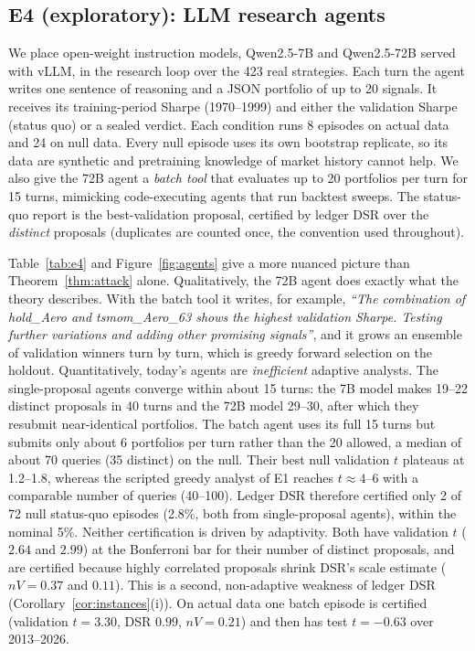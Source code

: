 \subsection{E4 (exploratory): LLM research agents}
We place open-weight instruction models, Qwen2.5-7B and Qwen2.5-72B \citep{qwen2024qwen25} served with vLLM, in the research loop over the 423 real strategies. Each turn the agent writes one sentence of reasoning and a JSON portfolio of up to 20 signals. It receives its training-period Sharpe (1970--1999) and either the validation Sharpe (status quo) or a sealed verdict. Each condition runs 8 episodes on actual data and 24 on null data. Every null episode uses its own bootstrap replicate, so its data are synthetic and pretraining knowledge of market history cannot help. We also give the 72B agent a \emph{batch tool} that evaluates up to 20 portfolios per turn for 15 turns, mimicking code-executing agents that run backtest sweeps. The status-quo report is the best-validation proposal, certified by ledger DSR over the \emph{distinct} proposals (duplicates are counted once, the convention used throughout).



Table~\ref{tab:e4} and Figure~\ref{fig:agents} give a more nuanced picture than Theorem~\ref{thm:attack} alone. Qualitatively, the 72B agent does exactly what the theory describes. With the batch tool it writes, for example, \emph{``The combination of hold\_Aero and tsmom\_Aero\_63 shows the highest validation Sharpe. Testing further variations and adding other promising signals''}, and it grows an ensemble of validation winners turn by turn, which is greedy forward selection on the holdout. Quantitatively, today's agents are \emph{inefficient} adaptive analysts. The single-proposal agents converge within about 15 turns: the 7B model makes 19--22 distinct proposals in 40 turns and the 72B model 29--30, after which they resubmit near-identical portfolios. The batch agent uses its full 15 turns but submits only about 6 portfolios per turn rather than the 20 allowed, a median of about 70 queries (35 distinct) on the null. Their best null validation $t$ plateaus at 1.2--1.8, whereas the scripted greedy analyst of E1 reaches $t\approx4$--$6$ with a comparable number of queries (40--100). Ledger DSR therefore certified only 2 of 72 null status-quo episodes (2.8\%, both from single-proposal agents), within the nominal 5\%. Neither certification is driven by adaptivity. Both have validation $t$ ($2.64$ and $2.99$) at the Bonferroni bar for their number of distinct proposals, and are certified because highly correlated proposals shrink DSR's scale estimate ($nV=0.37$ and $0.11$). This is a second, non-adaptive weakness of ledger DSR (Corollary~\ref{cor:instances}(i)). On actual data one batch episode is certified (validation $t=3.30$, DSR $0.99$, $nV=0.21$) and then has test $t=-0.63$ over 2013--2026.

